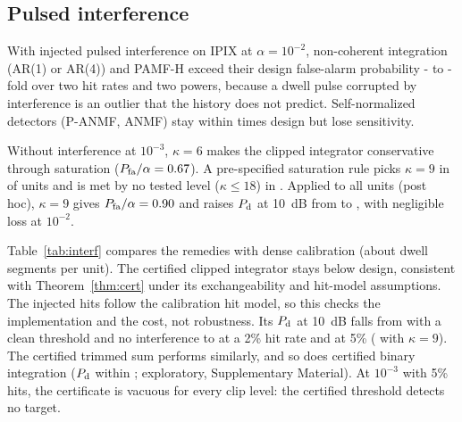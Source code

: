 \documentclass[journal]{IEEEtran}
\begin{document}
\subsection{Pulsed interference}\label{sec:interf}
\begin{table}[!t]
\centering\footnotesize
\caption{Remedies for pulsed interference on IPIX ($\alpha=0.01$, \NUnitsConf{} units). Interference is injected 30~dB above the local power; each pulse is hit with probability $p_{\rm h}$, and bursts are eight pulses long at $p_{\rm h}=5\%$. Entries are the measured $P_{\rm fa}/\alpha$ and the $P_{\rm d}$ of a 10~dB persistent target. Trimmed: \TrimTwo{} ($2\%$) and \TrimFive{} ($5\%$) of eight terms discarded. Bold: $P_{\rm fa}/\alpha>1.2$.}
\label{tab:interf}
\setlength{\tabcolsep}{2.4pt}

\end{table}
With injected pulsed interference on IPIX at $\alpha=10^{-2}$, non-coherent integration (AR(1) or AR(4)) and PAMF-H exceed their design false-alarm probability \IPfaMinAll- to \IPfaMaxInt-fold over two hit rates and two powers, because a dwell pulse corrupted by interference is an outlier that the history does not predict. Self-normalized detectors (P-ANMF, ANMF) stay within \SelfNormIntMax{} times design but lose sensitivity.

Without interference at $10^{-3}$, $\kappa=6$ makes the clipped integrator conservative through saturation ($P_{\rm fa}/\alpha=0.67$). A pre-specified saturation rule picks $\kappa=9$ in {\KappaNineUnits} of \NUnitsConf{} units and is met by no tested level ($\kappa\le18$) in \KappaRuleUndefUnits. Applied to all units (post hoc), $\kappa=9$ gives $P_{\rm fa}/\alpha=0.90$ and raises $P_{\rm d}$ at 10~dB from \KappaSixPdThree{} to \KappaNinePdThree, with negligible loss at $10^{-2}$.

Table~\ref{tab:interf} compares the remedies with dense calibration (about \DwellSegsPerUnit{} dwell segments per unit). The certified clipped integrator stays below design, consistent with Theorem~\ref{thm:cert} under its exchangeability and hit-model assumptions. The injected hits follow the calibration hit model, so this checks the implementation and the cost, not robustness. Its $P_{\rm d}$ at 10~dB falls from \CleanClipPdTen{} with a clean threshold and no interference to \CertSixPdTwo{} at a 2\% hit rate and \CertSixPdFive{} at 5\% (\CertNinePdFive{} with $\kappa=9$). The certified trimmed sum performs similarly, and so does certified binary integration ($P_{\rm d}$ within \BinCertGapMax; exploratory, Supplementary Material). At $10^{-3}$ with 5\% hits, the certificate is vacuous for every clip level: the certified threshold detects no target.
\end{document}
